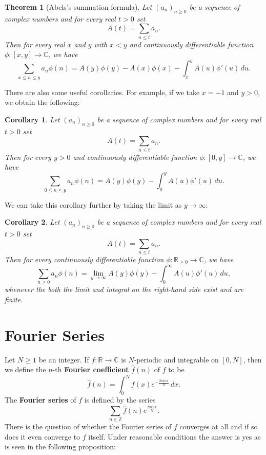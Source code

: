 \documentclass[12pt]{book}
\newtheorem{theorem}{Theorem}[section]
\newtheorem{corollary}{Corollary}[section]
\theoremstyle{definition}\newframedtheorem{method}{Method}
\newcommand{\Z}{\mathbb{Z}}
\newcommand{\R}{\mathbb{R}}
\newcommand{\C}{\mathbb{C}}
\newcommand{\<}{\langle}
\renewcommand{\>}{\rangle}
\begin{document}
    \begin{theorem}[Abels's summation formula]
      Let $(a_{n})_{n \ge 0}$ be a sequence of complex numbers and for every real $t > 0$ set
      \[
        A(t) = \sum_{n \le t}a_{n}.
      \]
      Then for every real $x$ and $y$ with $x < y$ and continuously differentiable function $\phi:[x,y] \to \C$, we have
      \[
        \sum_{x \le n \le y}a_{n}\phi(n) = A(y)\phi(y)-A(x)\phi(x)-\int_{x}^{y}A(u)\phi'(u)\,du.
      \]
    \end{theorem}

    There are also some useful corollaries. For example, if we take $x = -1$ and $y > 0$, we obtain the following:

    \begin{corollary}
      Let $(a_{n})_{n \ge 0}$ be a sequence of complex numbers and for every real $t > 0$ set
      \[
        A(t) = \sum_{n \le t}a_{n}.
      \]
      Then for every $y > 0$ and continuously differentiable function $\phi:[0,y] \to \C$, we have
      \[
        \sum_{0 \le n \le y}a_{n}\phi(n) = A(y)\phi(y)-\int_{0}^{y}A(u)\phi'(u)\,du.
      \]
    \end{corollary}

    We can take this corollary further by taking the limit as $y \to \infty$:

    \begin{corollary}
      Let $(a_{n})_{n \ge 0}$ be a sequence of complex numbers and for every real $t > 0$ set
      \[
        A(t) = \sum_{n \le t}a_{n}.
      \]
      Then for every continuously differentiable function $\phi:\R_{\ge 0} \to \C$, we have
      \[
        \sum_{n \ge 0}a_{n}\phi(n) = \lim_{y \to \infty}A(y)\phi(y)-\int_{0}^{\infty}A(u)\phi'(u)\,du,
      \]
      whenever the both the limit and integral on the right-hand side exist and are finite.
    \end{corollary}
  \section{Fourier Series}\label{append:Fourier_Series}
      Let $N \ge 1$ be an integer. If $f:\R \to \C$ is $N$-periodic and integrable on $[0,N]$, then we define the $n$-th \textbf{Fourier coefficient} $\hat{f}(n)$ of $f$ to be
      \[
        \hat{f}(n) = \int_{0}^{N}f(x)e^{-\frac{2\pi inx}{N}}\,dx.
      \]
      The \textbf{Fourier series} of $f$ is defined by the series
      \[
        \sum_{n \in \Z}\hat{f}(n)e^{\frac{2\pi inx}{N}}.
      \]
      There is the question of whether the Fourier series of $f$ converges at all and if so does it even converge to $f$ itself. Under reasonable conditions the answer is yes as is seen in the following proposition:
\end{document}
